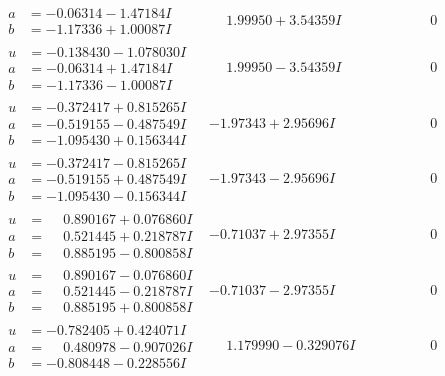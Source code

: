 \documentclass[1p]{elsarticle_modified}
\theoremstyle{definition}
\begin{document}
$$\begin{array}{c|c|c}
\begin{aligned}
a &= -0.06314 - 1.47184 I \\
b &= -1.17336 + 1.00087 I\end{aligned}
 & \phantom{-}1.99950 + 3.54359 I & \phantom{-0.000000 } 0 \\ \hline\begin{aligned}
u &= -0.138430 - 1.078030 I \\
a &= -0.06314 + 1.47184 I \\
b &= -1.17336 - 1.00087 I\end{aligned}
 & \phantom{-}1.99950 - 3.54359 I & \phantom{-0.000000 } 0 \\ \hline\begin{aligned}
u &= -0.372417 + 0.815265 I \\
a &= -0.519155 - 0.487549 I \\
b &= -1.095430 + 0.156344 I\end{aligned}
 & -1.97343 + 2.95696 I & \phantom{-0.000000 } 0 \\ \hline\begin{aligned}
u &= -0.372417 - 0.815265 I \\
a &= -0.519155 + 0.487549 I \\
b &= -1.095430 - 0.156344 I\end{aligned}
 & -1.97343 - 2.95696 I & \phantom{-0.000000 } 0 \\ \hline\begin{aligned}
u &= \phantom{-}0.890167 + 0.076860 I \\
a &= \phantom{-}0.521445 + 0.218787 I \\
b &= \phantom{-}0.885195 - 0.800858 I\end{aligned}
 & -0.71037 + 2.97355 I & \phantom{-0.000000 } 0 \\ \hline\begin{aligned}
u &= \phantom{-}0.890167 - 0.076860 I \\
a &= \phantom{-}0.521445 - 0.218787 I \\
b &= \phantom{-}0.885195 + 0.800858 I\end{aligned}
 & -0.71037 - 2.97355 I & \phantom{-0.000000 } 0 \\ \hline\begin{aligned}
u &= -0.782405 + 0.424071 I \\
a &= \phantom{-}0.480978 - 0.907026 I \\
b &= -0.808448 - 0.228556 I\end{aligned}
 & \phantom{-}1.179990 - 0.329076 I & \phantom{-0.000000 } 0 \\ \hline\begin{aligned}

\end{aligned}
\end{array}$$
\end{document}
